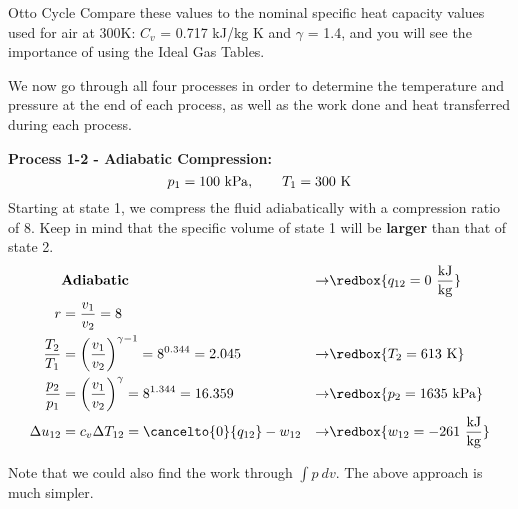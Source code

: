 \begin{example}[label=ex:ch3_otto]{Otto Cycle}
Compare these values to the nominal specific heat capacity values used for air at 300K: $C_v$ = 0.717 kJ/kg K and $\gamma$ = 1.4, and you will see the importance of using the Ideal Gas Tables.

We now go through all four processes in order to determine the temperature and pressure at the end of each process, as well as the work done and heat transferred during each process.

{\bf Process 1-2 - Adiabatic Compression:}
\begin{equation*}
  p_1 = 100\ {\rm kPa}, \quad \quad T_1 = 300\ {\rm K}
\end{equation*}
Starting at state 1, we compress the fluid adiabatically with a compression ratio of 8.  Keep in mind that the specific volume of state 1 will be {\bf larger} than that of state 2.
\begin{align*}
  &{\rm \bf Adiabatic} &\rightarrow& \redbox{q_{12} = 0\ \frac{\rm kJ}{\rm kg}} \\
  r &= \frac{v_1}{v_2} = 8 \\
  \frac{T_2}{T_1} &= \left(\frac{v_1}{v_2}\right)^{\gamma -1} = 8^{0.344} = 2.045 &\rightarrow & \redbox{T_2 = 613\ {\rm K}} \\
  \frac{p_2}{p_1} &= \left(\frac{v_1}{v_2}\right)^{\gamma} = 8^{1.344} = 16.359 &\rightarrow& \redbox{ p_2 = 1635\ {\rm kPa}}\\
\Delta u_{12} &= c_v \Delta T_{12} = \cancelto{0}{q_{12}} - w_{12} &\rightarrow& \redbox{w_{12} = -261\ \frac{\rm kJ}{\rm kg}}
\end{align*}

Note that we could also find the work through $\int p\: dv$.  The above approach is much simpler.


\end{example}
